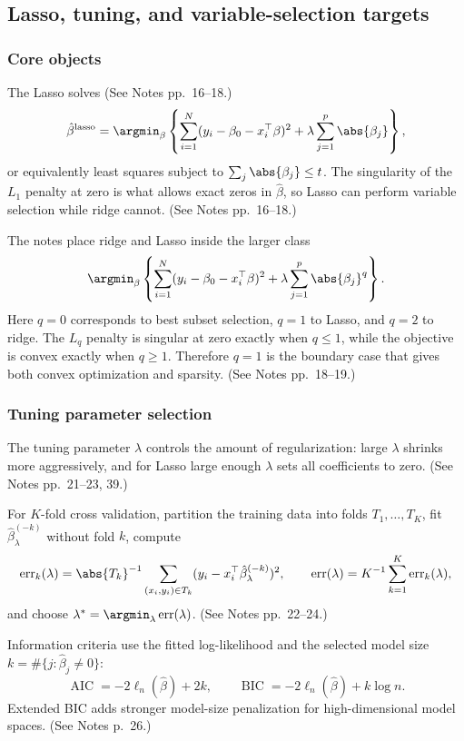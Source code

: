 \subsection{Lasso, tuning, and variable-selection targets}
\subsubsection{Core objects}
The Lasso solves (See Notes pp.~16--18.)
\[
\hat\beta^{\mathrm{lasso}}
= \argmin_{\beta}
\left\{\sum_{i=1}^N
(y_i-\beta_0-x_i^\top\beta)^2
+\lambda\sum_{j=1}^p \abs{\beta_j}\right\},
\]
or equivalently least squares subject to $\sum_j \abs{\beta_j}\le t$. The singularity of the $L_1$ penalty at zero is what allows exact zeros in $\hat\beta$, so Lasso can perform variable selection while ridge cannot. (See Notes pp.~16--18.)

The notes place ridge and Lasso inside the larger class
\[
\argmin_\beta
\left\{
\sum_{i=1}^N(y_i-\beta_0-x_i^\top\beta)^2
+\lambda\sum_{j=1}^p \abs{\beta_j}^q
\right\}.
\]
Here $q=0$ corresponds to best subset selection, $q=1$ to Lasso, and $q=2$ to ridge. The $L_q$ penalty is singular at zero exactly when $q\le 1$, while the objective is convex exactly when $q\ge 1$. Therefore $q=1$ is the boundary case that gives both convex optimization and sparsity. (See Notes pp.~18--19.)


\subsubsection{Tuning parameter selection}
The tuning parameter $\lambda$ controls the amount of regularization: large $\lambda$ shrinks more aggressively, and for Lasso large enough $\lambda$ sets all coefficients to zero. (See Notes pp.~21--23, 39.)

For $K$-fold cross validation, partition the training data into folds $T_1,\ldots,T_K$, fit $\hat\beta_\lambda^{(-k)}$ without fold $k$, compute
\[
\operatorname{err}_k(\lambda)
=\abs{T_k}^{-1}\sum_{(x_i,y_i)\in T_k}
(y_i-x_i^\top\hat\beta_\lambda^{(-k)})^2,
\qquad
\operatorname{err}(\lambda)=K^{-1}\sum_{k=1}^K\operatorname{err}_k(\lambda),
\]
and choose $\lambda^*=\argmin_\lambda \operatorname{err}(\lambda)$. (See Notes pp.~22--24.)

Information criteria use the fitted log-likelihood and the selected model size $k=\#\{j:\hat\beta_j\ne0\}$:
\[
\operatorname{AIC}=-2\ell_n(\hat\beta)+2k,
\qquad
\operatorname{BIC}=-2\ell_n(\hat\beta)+k\log n.
\]
 Extended BIC adds stronger model-size penalization for high-dimensional model spaces. (See Notes p.~26.)


